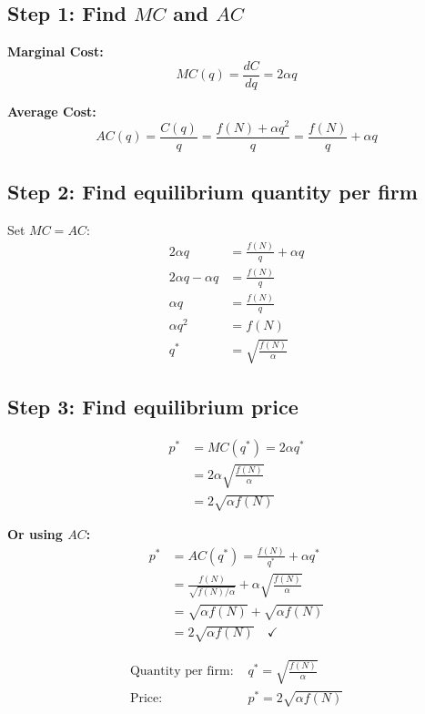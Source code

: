 \documentclass[11pt]{article}
\begin{document}
\subsection{Step 1: Find $MC$ and $AC$}

\textbf{Marginal Cost:}
\[
MC(q) = \frac{dC}{dq} = 2\alpha q
\]

\textbf{Average Cost:}
\[
AC(q) = \frac{C(q)}{q} = \frac{f(N) + \alpha q^2}{q} = \frac{f(N)}{q} + \alpha q
\]

\subsection{Step 2: Find equilibrium quantity per firm}

Set $MC = AC$:
\begin{align*}
2\alpha q &= \frac{f(N)}{q} + \alpha q \\
2\alpha q - \alpha q &= \frac{f(N)}{q} \\
\alpha q &= \frac{f(N)}{q} \\
\alpha q^2 &= f(N) \\
q^* &= \sqrt{\frac{f(N)}{\alpha}}
\end{align*}

\subsection{Step 3: Find equilibrium price}

\begin{align*}
p^* &= MC(q^*) = 2\alpha q^* \\
&= 2\alpha \sqrt{\frac{f(N)}{\alpha}} \\
&= 2\sqrt{\alpha f(N)}
\end{align*}

\textbf{Or using $AC$:}
\begin{align*}
p^* &= AC(q^*) = \frac{f(N)}{q^*} + \alpha q^* \\
&= \frac{f(N)}{\sqrt{f(N)/\alpha}} + \alpha \sqrt{\frac{f(N)}{\alpha}} \\
&= \sqrt{\alpha f(N)} + \sqrt{\alpha f(N)} \\
&= 2\sqrt{\alpha f(N)} \quad \checkmark
\end{align*}

\begin{tcolorbox}[colback=yellow!10, colframe=orange!75!black, title=Final Answer for 2(b):]
\Large
\begin{align*}
\text{Quantity per firm: } & \boxed{q^* = \sqrt{\frac{f(N)}{\alpha}}} \\[0.3cm]
\text{Price: } & \boxed{p^* = 2\sqrt{\alpha f(N)}}
\end{align*}
\end{tcolorbox}
\end{document}
